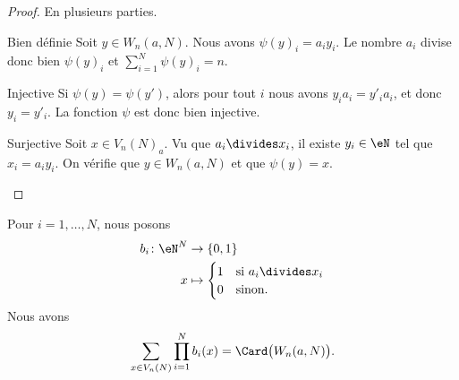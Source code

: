 \begin{proof}
    En plusieurs parties.
    \begin{subproof}
        \item[Bien définie]
            Soit \( y\in W_n(a,N)\). Nous avons \( \psi(y)_i=a_iy_i\). Le nombre \( a_i\) divise donc bien \( \psi(y)_i\) et \( \sum_{i=1}^N\psi(y)_i=n\).
        \item[Injective]
            Si \( \psi(y)=\psi(y')\), alors pour tout \( i\) nous avons \( y_ia_i=y'_ia_i\), et donc \( y_i=y'_i\). La fonction \( \psi\) est donc bien injective.
        \item[Surjective]
            Soit \( x\in V_n(N)_a\). Vu que \( a_i\divides x_i\), il existe \( y_i\in \eN\) tel que \( x_i=a_iy_i\). On vérifie que \( y\in W_n(a,N)\) et que \( \psi(y)=x\).
    \end{subproof}
\end{proof}


\begin{lemma}       \label{LEMooOPXHooHzoHrm}
    Pour \( i=1,\ldots, N\), nous posons
    \begin{equation}
        \begin{aligned}
            b_i\colon \eN^N&\to \{ 0,1 \} \\
            x&\mapsto \begin{cases}
                1    &   \text{si } a_i\divides x_i\\
                0    &    \text{sinon. }
            \end{cases}
        \end{aligned}
    \end{equation}
    Nous avons
    \begin{equation}
        \sum_{x\in V_n(N)}\prod_{i=1}^Nb_i(x)=\Card\big( W_n(a,N) \big).
    \end{equation}
\end{lemma}

